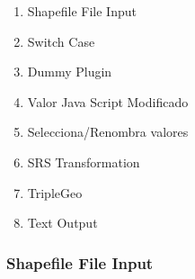 \begin{enumerate}
    \item Shapefile File Input
    \item Switch Case
    \item Dummy Plugin
    \item Valor Java Script Modificado
    \item Selecciona/Renombra valores
    \item SRS Transformation
    \item TripleGeo
    \item Text Output
\end{enumerate}


\subsubsection{Shapefile File Input}

